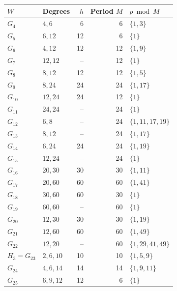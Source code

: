 \documentclass[10pt,a4paper]{amsart}
\theoremstyle{definition}
\begin{document}
\begin{table}[htbp]
\centering\small
\setlength{\tabcolsep}{4pt}
\begin{tabular}{@{}lL{.31\textwidth}rrL{.25\textwidth}@{}}
\toprule $W$ & Degrees & $h$ & Period $M$ & $p\bmod M$\\\midrule
$G_{4}$ & $4,\allowbreak 6$ & 6 & 6 & $\{1,\allowbreak 3\}$ \\
$G_{5}$ & $6,\allowbreak 12$ & 12 & 6 & $\{1\}$ \\
$G_{6}$ & $4,\allowbreak 12$ & 12 & 12 & $\{1,\allowbreak 9\}$ \\
$G_{7}$ & $12,\allowbreak 12$ & -- & 12 & $\{1\}$ \\
$G_{8}$ & $8,\allowbreak 12$ & 12 & 12 & $\{1,\allowbreak 5\}$ \\
$G_{9}$ & $8,\allowbreak 24$ & 24 & 24 & $\{1,\allowbreak 17\}$ \\
$G_{10}$ & $12,\allowbreak 24$ & 24 & 12 & $\{1\}$ \\
$G_{11}$ & $24,\allowbreak 24$ & -- & 24 & $\{1\}$ \\
$G_{12}$ & $6,\allowbreak 8$ & -- & 24 & $\{1,\allowbreak 11,\allowbreak 17,\allowbreak 19\}$ \\
$G_{13}$ & $8,\allowbreak 12$ & -- & 24 & $\{1,\allowbreak 17\}$ \\
$G_{14}$ & $6,\allowbreak 24$ & 24 & 24 & $\{1,\allowbreak 19\}$ \\
$G_{15}$ & $12,\allowbreak 24$ & -- & 24 & $\{1\}$ \\
$G_{16}$ & $20,\allowbreak 30$ & 30 & 30 & $\{1,\allowbreak 11\}$ \\
$G_{17}$ & $20,\allowbreak 60$ & 60 & 60 & $\{1,\allowbreak 41\}$ \\
$G_{18}$ & $30,\allowbreak 60$ & 60 & 30 & $\{1\}$ \\
$G_{19}$ & $60,\allowbreak 60$ & -- & 60 & $\{1\}$ \\
$G_{20}$ & $12,\allowbreak 30$ & 30 & 30 & $\{1,\allowbreak 19\}$ \\
$G_{21}$ & $12,\allowbreak 60$ & 60 & 60 & $\{1,\allowbreak 49\}$ \\
$G_{22}$ & $12,\allowbreak 20$ & -- & 60 & $\{1,\allowbreak 29,\allowbreak 41,\allowbreak 49\}$ \\
$H_3=G_{23}$ & $2,\allowbreak 6,\allowbreak 10$ & 10 & 10 & $\{1,\allowbreak 5,\allowbreak 9\}$ \\
$G_{24}$ & $4,\allowbreak 6,\allowbreak 14$ & 14 & 14 & $\{1,\allowbreak 9,\allowbreak 11\}$ \\
$G_{25}$ & $6,\allowbreak 9,\allowbreak 12$ & 12 & 6 & $\{1\}$ \\

\end{tabular}
\end{table}
\end{document}
